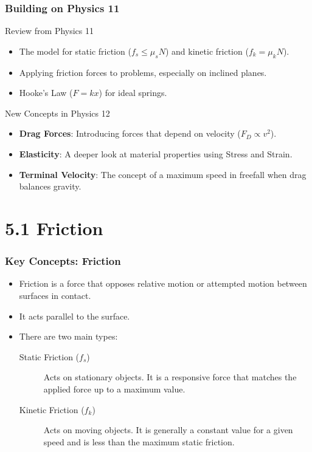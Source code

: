 \documentclass{beamer}
\begin{document}
\begin{frame}
\frametitle{Building on Physics 11}
\begin{block}{Review from Physics 11}
\begin{itemize}
    \item The model for static friction ($f_s \leq \mu_s N$) and kinetic friction ($f_k = \mu_k N$). \pause
    \item Applying friction forces to problems, especially on inclined planes. \pause
    \item Hooke's Law ($F = kx$) for ideal springs.
\end{itemize}
\end{block} \pause

\begin{block}{New Concepts in Physics 12}
\begin{itemize}
    \item \textbf{Drag Forces}: Introducing forces that depend on velocity ($F_D \propto v^2$). \pause
    \item \textbf{Elasticity}: A deeper look at material properties using Stress and Strain. \pause
    \item \textbf{Terminal Velocity}: The concept of a maximum speed in freefall when drag balances gravity.
\end{itemize}
\end{block}
\end{frame}

\section{5.1 Friction}

\begin{frame}
\frametitle{Key Concepts: Friction}
\begin{itemize}
    \item Friction is a force that opposes relative motion or attempted motion between surfaces in contact. \pause
    \item It acts parallel to the surface. \pause
    \item There are two main types:
    \begin{description}
        \item[Static Friction ($f_s$)] Acts on stationary objects. It is a \alert{responsive force} that matches the applied force up to a maximum value. \pause
        \item[Kinetic Friction ($f_k$)] Acts on moving objects. It is generally a constant value for a given speed and is \alert{less than} the maximum static friction.
    \end{description}
\end{itemize}
\end{frame}
\end{document}

